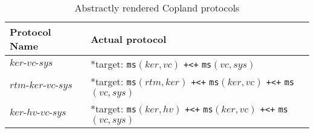 \documentclass[runningheads]{llncs}
\theoremstyle{definition}
\begin{document}

\begin{table}[h]
  \setlength\extrarowheight{7pt}
  \centering
  \footnotesize
  \begin{tabular}{|M{2.2cm}|M{9.7cm}|N}
      \hline
      Protocol Name & Actual protocol &\\
      \hline   
      $ker\text{-}vc\text{-}sys$ & *target:  \texttt{ms}$(ker, vc)$ \texttt{+<+} \texttt{ms}$(vc, sys)$ &\\ \hline 
      $rtm\text{-}ker\text{-}vc\text{-}sys$ & *target: \texttt{ms}$(rtm, ker)$ \texttt{+<+} \texttt{ms}$(ker, vc)$ \texttt{+<+} \texttt{ms}$(vc, sys)$ &\\
      \hline
      $ker\text{-}hv\text{-}vc\text{-}sys$ & *target: \texttt{ms}$(ker, hv)$ \texttt{+<+} \texttt{ms}$(ker, vc)$ \texttt{+<+} \texttt{ms}$(vc, sys)$ &\\ \hline 
  \end{tabular}
  \caption[Chase Analysis with Varied Dependencies]{Abstractly rendered Copland protocols}
  \label{Chase-table}
\end{table}
\end{document}
